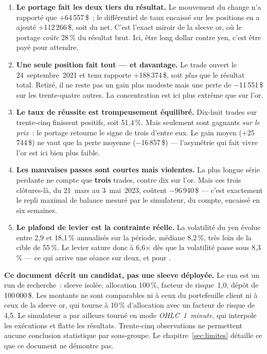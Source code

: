 \begin{enumerate}[leftmargin=1.4em, itemsep=0.45em]

\item \textbf{Le portage fait les deux tiers du résultat.} Le mouvement du
change n'a rapporté que $+$64\,557\,\$~; le différentiel de taux encaissé sur
les positions en a ajouté $+$112\,266\,\$, soit  du net. C'est
l'exact miroir de la sleeve or, où le portage \emph{coûte} 28\,\% du résultat
brut. Ici, être long dollar contre yen, c'est être payé pour attendre.

\item \textbf{Une seule position fait tout --- et davantage.} Le trade ouvert
le 24~septembre~2021 et tenu  rapporte $+$188\,374\,\$, soit
\emph{plus} que le résultat total. Retiré, il ne reste pas un gain plus modeste
mais une perte de $-$11\,551\,\$ sur les trente-quatre autres. La concentration
est ici plus extrême que sur l'or.

\item \textbf{Le taux de réussite est trompeusement équilibré.} Dix-huit trades
sur trente-cinq finissent positifs, soit 51,4\,\%. Mais seulement
 sont gagnants \emph{sur le prix}~: le portage retourne le signe
de trois d'entre eux. Le gain moyen ($+$25\,744\,\$) ne vaut que
 la perte moyenne ($-$16\,857\,\$) --- l'asymétrie qui fait
vivre l'or est ici bien plus faible.

\item \textbf{Les mauvaises passes sont courtes mais violentes.} La plus longue
série perdante ne compte que \textbf{trois} trades, contre dix sur l'or. Mais
ces trois clôtures-là, du 21~mars au 3~mai~2023, coûtent $-$96\,940\,\$ ---
c'est exactement le repli maximal de balance mesuré par le simulateur,
 du compte, encaissé en six semaines.

\item \textbf{Le plafond de levier est la contrainte réelle.} La volatilité du
yen évolue entre 2,9 et 18,1\,\% annualisés sur la période, médiane 8,2\,\%,
très loin de la cible de 55\,\%. Le levier sature donc à 6,6$\times$ dès que la
volatilité passe sous 8,3\,\% --- ce qui arrive une séance sur deux, et pour
.

\end{enumerate}

\begin{warningbox}
\textbf{Ce document décrit un candidat, pas une sleeve déployée.} Le run est un
run de recherche~: sleeve isolée, allocation 100\,\%, facteur de risque~1,0,
dépôt de 100\,000\,\$. Les montants ne sont comparables ni à ceux du
portefeuille client ni à ceux de la sleeve or, qui tourne à 10\,\% d'allocation
avec un facteur de risque de 4,5. Le simulateur a par ailleurs tourné en mode
\emph{OHLC~1~minute}, qui interpole les exécutions et flatte les résultats.
Trente-cinq observations ne permettent aucune conclusion statistique par
sous-groupe. Le chapitre~\ref{sec:limites} détaille ce que ce document ne
démontre pas.
\end{warningbox}


